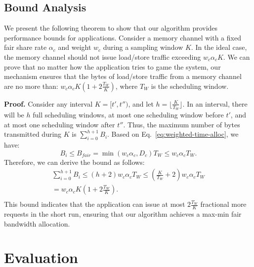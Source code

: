 \subsection{Bound Analysis}
\label{subsec:proto-theoretical}

We present the following theorem to show that our algorithm provides performance bounds for applications. Consider a memory channel with a fixed fair share rate  \(\alpha_c\) and weight  \(w_c\) during a sampling window  \(K\). In the ideal case, the memory channel should not issue load/store traffic exceeding  \( w_c \alpha_c K \). We can prove that no matter how the application tries to game the system, our mechanism ensures that the bytes of load/store traffic from a memory channel are no more than: \(w_c\alpha_c K(1+2 \frac{T_W}{K})\),
where \(T_W\) is the scheduling window.

\noindent
\textbf{Proof.} Consider any interval \( K = [t', t'') \), and let \( h = \lfloor \frac{K}{T_W} \rfloor \). In an interval, there will be \(h\) full scheduling windows, at most one scheduling window before \( t' \), and at most one scheduling window after \( t'' \). Thus, the maximum number of bytes transmitted during \( K \) is \(\sum_{i=0}^{h+1} B_i\).
Based on Eq.~\ref{eq:weighted-time-alloc}, we have:
\begin{equation}
B_i \leq B_{fair} = \min(w_c \alpha_c, D_c) T_W \leq w_c \alpha_c T_W.
\end{equation}
Therefore, we can derive the bound as follows:
\begin{equation}
\begin{split}
\sum_{i=0}^{h+1} B_i \leq (h+2) w_c \alpha_c T_W 
\leq \left(\frac{K}{T_W} + 2\right) w_c \alpha_c T_W \\
= w_c \alpha_c K \left(1 + 2 \frac{T_W}{K}\right). \\
\end{split}
\end{equation}
%
This bound indicates that the application can issue at most \(2 \frac{T_W}{K}\) fractional more requests in the short run, ensuring that our algorithm achieves a max-min fair bandwidth allocation.

% 
\section{Evaluation}
\label{sec:eval}


